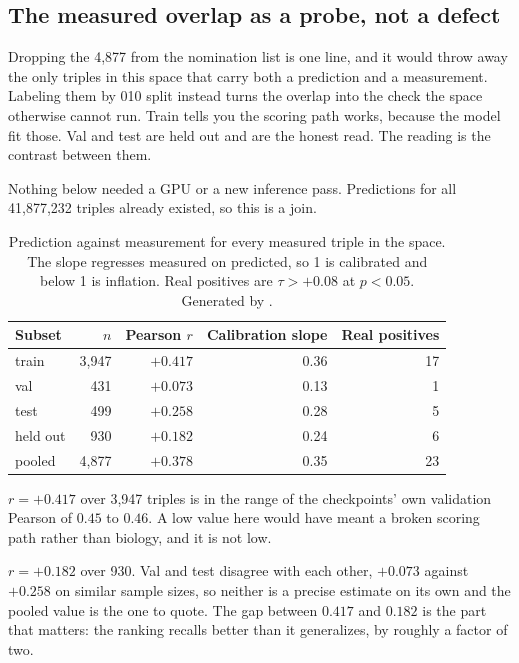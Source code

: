 \subsection{The measured overlap as a probe, not a defect}

Dropping the 4{,}877 from the nomination list is one line, and it would throw away
the only triples in this space that carry both a prediction and a measurement.
Labeling them by 010 split instead turns the overlap into the check the space
otherwise cannot run. Train tells you the scoring path works, because the model fit
those. Val and test are held out and are the honest read. The reading is the
contrast between them.

Nothing below needed a GPU or a new inference pass. Predictions for all
41{,}877{,}232 triples already existed, so this is a join.

\begin{table}[H]
\centering
\footnotesize
\begin{tabular}{lrrrr}
\toprule
Subset & $n$ & Pearson $r$ & Calibration slope & Real positives \\
\midrule
train    & 3{,}947 & $+0.417$ & 0.36 & 17 \\
val      &   431 & $+0.073$ & 0.13 &  1 \\
test     &   499 & $+0.258$ & 0.28 &  5 \\
\midrule
held out &   930 & $+0.182$ & 0.24 &  6 \\
pooled   & 4{,}877 & $+0.378$ & 0.35 & 23 \\
\bottomrule
\end{tabular}
\caption{Prediction against measurement for every measured triple in the space.
The slope regresses measured on predicted, so 1 is calibrated and below 1 is
inflation. Real positives are $\tau > +0.08$ at $p < 0.05$. Generated by
\protect{}.}
\end{table}

 $r = +0.417$ over 3{,}947 triples
is in the range of the checkpoints' own validation Pearson of $0.45$ to $0.46$. A
low value here would have meant a broken scoring path rather than biology, and it
is not low.

 $r = +0.182$ over 930. Val and test
disagree with each other, $+0.073$ against $+0.258$ on similar sample sizes, so
neither is a precise estimate on its own and the pooled value is the one to quote.
The gap between $0.417$ and $0.182$ is the part that matters: the ranking recalls
better than it generalizes, by roughly a factor of two.

